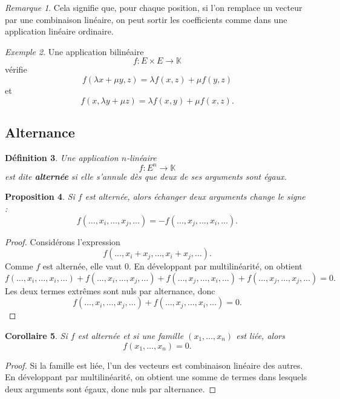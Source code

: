 \documentclass[11pt,a4paper]{article}
\newtheorem{definition}{Définition}[section]
\newtheorem{proposition}[definition]{Proposition}
\newtheorem{corollaire}[definition]{Corollaire}
\theoremstyle{remark}
\newtheorem{remarque}[definition]{Remarque}
\newtheorem{exemple}[definition]{Exemple}
\newcommand{\K}{\mathbb{K}}
\begin{document}
\begin{remarque}
Cela signifie que, pour chaque position, si l’on remplace un vecteur par une combinaison linéaire, on peut sortir les coefficients comme dans une application linéaire ordinaire.
\end{remarque}

\begin{exemple}
Une application bilinéaire
\[
f:E\times E\to\K
\]
vérifie
\[
f(\lambda x+\mu y,z)=\lambda f(x,z)+\mu f(y,z)
\]
et
\[
f(x,\lambda y+\mu z)=\lambda f(x,y)+\mu f(x,z).
\]
\end{exemple}

\subsection{Alternance}

\begin{definition}
Une application \(n\)-linéaire
\[
f:E^n\to\K
\]
est dite \textbf{alternée} si elle s’annule dès que deux de ses arguments sont égaux.
\end{definition}

\begin{proposition}
Si \(f\) est alternée, alors échanger deux arguments change le signe :
\[
f(\dots,x_i,\dots,x_j,\dots)=-f(\dots,x_j,\dots,x_i,\dots).
\]
\end{proposition}

\begin{proof}
Considérons l’expression
\[
f(\dots,x_i+x_j,\dots,x_i+x_j,\dots).
\]
Comme \(f\) est alternée, elle vaut \(0\). En développant par multilinéarité, on obtient
\[
f(\dots,x_i,\dots,x_i,\dots)
+
f(\dots,x_i,\dots,x_j,\dots)
+
f(\dots,x_j,\dots,x_i,\dots)
+
f(\dots,x_j,\dots,x_j,\dots)
=0.
\]
Les deux termes extrêmes sont nuls par alternance, donc
\[
f(\dots,x_i,\dots,x_j,\dots)+f(\dots,x_j,\dots,x_i,\dots)=0.
\]
\end{proof}

\begin{corollaire}
Si \(f\) est alternée et si une famille \((x_1,\dots,x_n)\) est liée, alors
\[
f(x_1,\dots,x_n)=0.
\]
\end{corollaire}

\begin{proof}
Si la famille est liée, l’un des vecteurs est combinaison linéaire des autres. En développant par multilinéarité, on obtient une somme de termes dans lesquels deux arguments sont égaux, donc nuls par alternance.
\end{proof}
\end{document}
